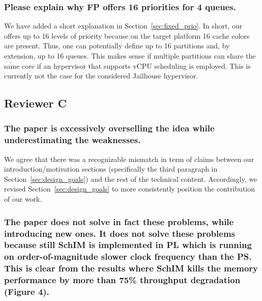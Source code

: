         \subsubsection{Please explain why FP offers 16 priorities for
        4 queues.}

        We have added a short explanation in
        Section~\ref{sec:fixed_prio}. In short, our \schim offers up
        to 16 levels of priority because on the target platform 16
        cache colors are present. Thus, one can potentially define up
        to 16 partitions and, by extension, up to 16 queues. This
        makes sense if multiple partitions can share the same core if
        an hypervisor that supports vCPU scheduling is employed. This
        is currently not the case for the considered Jailhouse
        hypervisor.

    \subsection{Reviewer C}

        \subsubsection{The paper is excessively overselling the idea
        while underestimating the weaknesses.}

        We agree that there was a recognizable mismatch in term of
        claims between our introduction/motivation sections
        (specifically the third paragraph in
        Section~\ref{sec:design_goals}) and the rest of the technical
        content. Accordingly, we revised
        Section~\ref{sec:design_goals} to more consistently position
        the contribution of our work.

        \subsubsection{The paper does not solve in fact these
        problems, while introducing new ones. It does not solve these
        problems because still SchIM is implemented in PL which is
        running on order-of-magnitude slower clock frequency than the
        PS. This is clear from the results where SchIM kills the
        memory performance by more than 75\% throughput degradation
        (Figure 4).}

